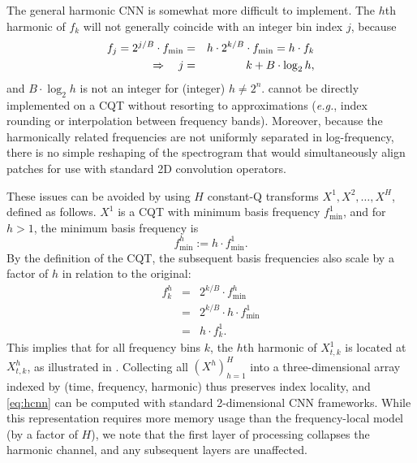 \documentclass{article}
\def\eg{\emph{e.g.}}
\begin{document}
The general harmonic CNN is somewhat more difficult to implement.
The $h$th harmonic of $f_k$ will not generally coincide with an integer bin index $j$, because
\begin{eqnarray}
    f_j = 2^{j/B} \cdot f_{\min} &=& h \cdot 2^{k/B}\cdot f_{\min} = h \cdot f_k \notag \\
\Rightarrow \quad j &=& k + B \cdot \log_2 h,
\end{eqnarray}
and $B \cdot\log_2 h$ is not an integer for (integer) $h \neq 2^n$.
 cannot be directly implemented on a CQT without resorting to approximations (\eg, index rounding or interpolation between frequency bands).
Moreover, because the harmonically related frequencies are not uniformly separated in log-frequency, there is no simple reshaping of the spectrogram that would simultaneously align patches for use with standard 2D convolution operators.

These issues can be avoided by using $H$ constant-Q transforms $X^1, X^2, \dots, X^H$, defined as follows.
$X^1$ is a CQT with minimum basis frequency $f^1_{\min}$,
and for $h > 1$, the minimum basis frequency is
\begin{equation}
    f^h_{\min} := h \cdot f^1_{\min}.\label{eq:fmin}
\end{equation}
By the definition of the CQT, the subsequent basis frequencies also scale by a factor of $h$ in relation to the original:
\begin{eqnarray}
    f^h_k &=& 2^{k/B} \cdot f^h_{\min}\\
        &=& 2^{k/B} \cdot h \cdot f^1_{\min}\\
    &=& h \cdot f^1_k.
\end{eqnarray}
This implies that for all frequency bins $k$, the $h$th harmonic of $X^1_{t, k}$ is located at $X^h_{t, k}$, as illustrated in .
Collecting all ${(X^h)}_{h=1}^H$ into a three-dimensional array indexed by (time, frequency, harmonic) thus preserves index locality, and \cref{eq:hcnn} can be computed with standard 2-dimensional CNN frameworks.
While this representation requires more memory usage than the frequency-local model (by a factor of $H$), we note that the first layer of processing collapses the harmonic channel, and any subsequent layers are unaffected.
\end{document}
